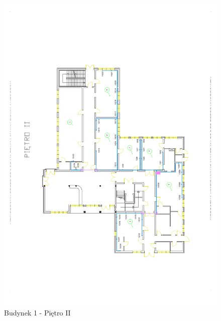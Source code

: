 \begin{figure}[H]
  \begin{center}
    \includegraphics[width=\textwidth]{img/s/b1-2.pdf}
    \caption{Budynek 1 - Piętro II}
  \end{center}
\end{figure}

